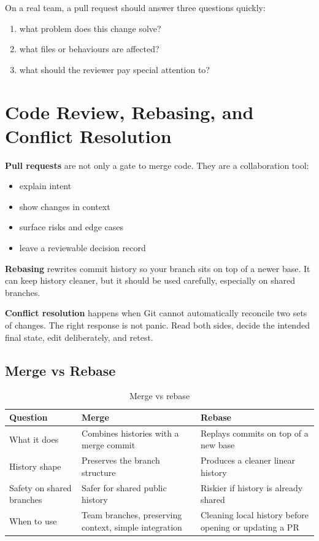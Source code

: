 \documentclass[12pt, a4paper, oneside]{book}
\begin{document}
\begin{projectbox}
On a real team, a pull request should answer three questions quickly:
\begin{enumerate}[leftmargin=2em]
    \item what problem does this change solve?
    \item what files or behaviours are affected?
    \item what should the reviewer pay special attention to?
\end{enumerate}
\end{projectbox}

\section{Code Review, Rebasing, and Conflict Resolution}

\textbf{Pull requests} are not only a gate to merge code. They are a collaboration tool:
\begin{itemize}[leftmargin=2em]
    \item explain intent
    \item show changes in context
    \item surface risks and edge cases
    \item leave a reviewable decision record
\end{itemize}

\textbf{Rebasing} rewrites commit history so your branch sits on top of a newer base. It can keep history cleaner, but it should be used carefully, especially on shared branches.

\textbf{Conflict resolution} happens when Git cannot automatically reconcile two sets of changes. The right response is not panic. Read both sides, decide the intended final state, edit deliberately, and retest.

\subsection{Merge vs Rebase}

\begin{table}[H]
\centering
\begin{tabular}{|p{}|p{}|p{}|}
\hline
\textbf{Question} & \textbf{Merge} & \textbf{Rebase} \\
\hline
What it does & Combines histories with a merge commit & Replays commits on top of a new base \\
\hline
History shape & Preserves the branch structure & Produces a cleaner linear history \\
\hline
Safety on shared branches & Safer for shared public history & Riskier if history is already shared \\
\hline
When to use & Team branches, preserving context, simple integration & Cleaning local history before opening or updating a PR \\
\hline
\end{tabular}
\caption{Merge vs rebase}
\end{table}
\end{document}
